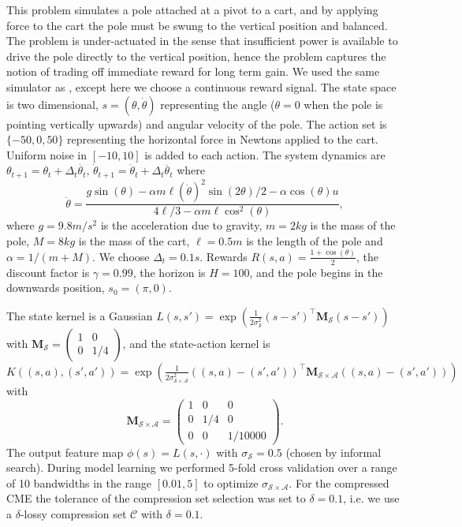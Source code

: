 \documentclass[letterpaper]{article}
\newcommand{\cC}{{\mathcal C}}
\newcommand{\cA}{{\mathcal A}}
\newcommand{\cS}{{\mathcal S}}
\newcommand{\bM}{{\bm M}}
\begin{document}
This problem simulates a pole attached at a pivot to a cart, and by applying force to the cart the pole must be swung to the vertical position and balanced. The problem is under-actuated in the sense that insufficient power is available to drive the pole directly to the vertical position, hence the problem captures the notion of trading off immediate reward for long term gain. We used the same simulator as \citet{DBLP:journals/jmlr/LagoudakisP03}, except here we choose a continuous reward signal. The state space is two dimensional, $s = (\theta, \dot{\theta})$ representing the angle ($\theta = 0$ when the pole is pointing vertically upwards) and angular velocity of the pole. The action set is $\{-50,0,50\}$ representing the horizontal force in Newtons applied to the cart. Uniform noise in $[-10,10]$ is added to each action. The system dynamics are $\theta_{t+1} = \theta_t + \Delta_t \dot {\theta_t}$, $\dot\theta_{t+1} = \dot\theta_t + \Delta_t \ddot {\theta_t}$ where
$$ \ddot {\theta} = \frac{g \sin(\theta) - \alpha m \ell (\dot{\theta})^2 \sin(2 \theta)/2 - \alpha \cos(\theta) u}{ 4\ell / 3 - \alpha m \ell \cos^2(\theta)}, $$
where $g=9.8m/s^2$ is the acceleration due to gravity, $m=2kg$ is the mass of the pole, $M = 8kg$ is the mass of the cart, $\ell = 0.5m$ is the length of the pole and $\alpha = 1/(m+M)$. We choose $\Delta_t = 0.1s$. Rewards $R(s,a) = \frac{1+ \cos(\theta)}{2}$, the discount factor is $\gamma = 0.99$, the horizon is $H=100$, and the pole begins in the downwards position, $s_0 = (\pi,0)$.

The state kernel is a Gaussian $L(s,s') = \exp\left({\frac{1}{2\sigma_{\cS}^2}(s - s')^\top \bM_\cS (s - s')}\right)$ with $\bM_\cS =\left( \begin{array}{cc}
1 & 0 \\
0 & 1/4 \end{array} \right)$, and the state-action kernel is  $K((s,a),(s',a')) = \exp\left({\frac{1}{2\sigma_{\cS\times\cA}^2}((s,a) - (s',a'))^\top \bM_{\cS\times\cA} ((s,a) - (s',a'))}\right)$ with
$$\bM_{\cS\times\cA} =\left( \begin{array}{ccc}
1 & 0 & 0\\
0 & 1/4 & 0\\
0 & 0 & 1/10000 \end{array} \right).$$ The output feature map $\phi(s) = L(s,\cdot)$ with $\sigma_{\cS} = 0.5$ (chosen by informal search). During model learning we performed 5-fold cross validation over a range of 10 bandwidths in the range $[0.01,5]$ to optimize $\sigma_{\cS\times\cA}$. For the compressed CME the tolerance of the compression set selection was set to $\delta = 0.1$, i.e. we use a $\delta$-lossy compression set $\cC$ with $\delta=0.1$.
\end{document}
